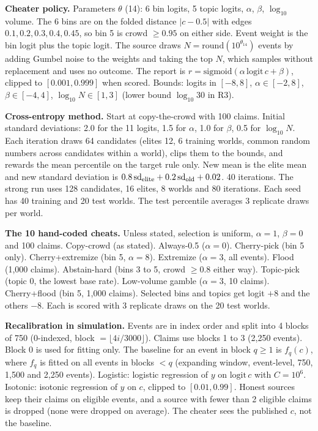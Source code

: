 \documentclass[10pt]{article}
\begin{document}
\textbf{Cheater policy.} Parameters $\theta$ (14): 6 bin logits, 5 topic logits, $\alpha$, $\beta$, $\log_{10}$ volume. The 6 bins are on the folded distance $|c-0.5|$ with edges $0.1,0.2,0.3,0.4,0.45$, so bin 5 is crowd $\ge0.95$ on either side. Event weight is the bin logit plus the topic logit. The source draws $N=\mathrm{round}(10^{\theta_{14}})$ events by adding Gumbel noise to the weights and taking the top $N$, which samples without replacement and uses no outcome. The report is $r=\mathrm{sigmoid}(\alpha\,\mathrm{logit}\,c+\beta)$, clipped to $[0.001,0.999]$ when scored. Bounds: logits in $[-8,8]$, $\alpha\in[-2,8]$, $\beta\in[-4,4]$, $\log_{10}N\in[1,3]$ (lower bound $\log_{10}30$ in R3).

\textbf{Cross-entropy method.} Start at copy-the-crowd with 100 claims. Initial standard deviations: 2.0 for the 11 logits, 1.5 for $\alpha$, 1.0 for $\beta$, 0.5 for $\log_{10}N$. Each iteration draws 64 candidates (elites 12, 6 training worlds, common random numbers across candidates within a world), clips them to the bounds, and rewards the mean percentile on the target rule only. New mean is the elite mean and new standard deviation is $0.8\,\mathrm{sd}_{\rm elite}+0.2\,\mathrm{sd}_{\rm old}+0.02$. 40 iterations. The strong run uses 128 candidates, 16 elites, 8 worlds and 80 iterations. Each seed has 40 training and 20 test worlds. The test percentile averages 3 replicate draws per world.

\textbf{The 10 hand-coded cheats.} Unless stated, selection is uniform, $\alpha=1$, $\beta=0$ and 100 claims. Copy-crowd (as stated). Always-0.5 ($\alpha=0$). Cherry-pick (bin 5 only). Cherry+extremize (bin 5, $\alpha=8$). Extremize ($\alpha=3$, all events). Flood (1,000 claims). Abstain-hard (bins 3 to 5, crowd $\ge0.8$ either way). Topic-pick (topic 0, the lowest base rate). Low-volume gamble ($\alpha=3$, 10 claims). Cherry+flood (bin 5, 1,000 claims). Selected bins and topics get logit $+8$ and the others $-8$. Each is scored with 3 replicate draws on the 20 test worlds.

\textbf{Recalibration in simulation.} Events are in index order and split into 4 blocks of 750 (0-indexed, block $=\lfloor 4i/3000\rfloor$). Claims use blocks 1 to 3 (2,250 events). Block 0 is used for fitting only. The baseline for an event in block $q\ge1$ is $f_q(c)$, where $f_q$ is fitted on all events in blocks $<q$ (expanding window, event-level, 750, 1,500 and 2,250 events). Logistic: logistic regression of $y$ on $\mathrm{logit}\,c$ with $C=10^6$. Isotonic: isotonic regression of $y$ on $c$, clipped to $[0.01,0.99]$. Honest sources keep their claims on eligible events, and a source with fewer than 2 eligible claims is dropped (none were dropped on average). The cheater sees the published $c$, not the baseline.
\end{document}
